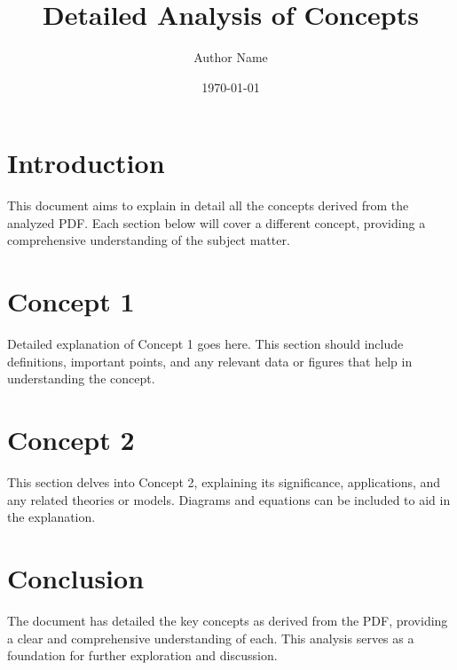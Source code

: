 \documentclass{article}
\title{Detailed Analysis of Concepts}
\author{Author Name}
\date{\today}
\begin{document}
\maketitle

\section{Introduction}
This document aims to explain in detail all the concepts derived from the analyzed PDF. Each section below will cover a different concept, providing a comprehensive understanding of the subject matter.


\section{Concept 1}
\label{sec:concept1}
Detailed explanation of Concept 1 goes here. This section should include definitions, important points, and any relevant data or figures that help in understanding the concept.

\section{Concept 2}
\label{sec:concept2}
This section delves into Concept 2, explaining its significance, applications, and any related theories or models. Diagrams and equations can be included to aid in the explanation.


\section{Conclusion}
The document has detailed the key concepts as derived from the PDF, providing a clear and comprehensive understanding of each. This analysis serves as a foundation for further exploration and discussion.
\end{document}
